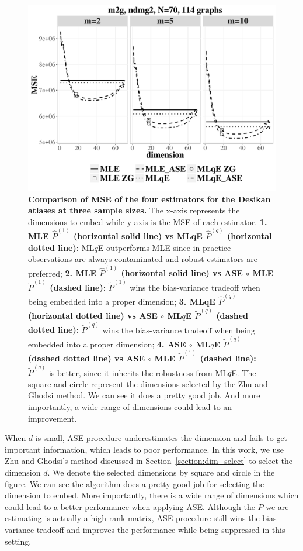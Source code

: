 \documentclass[a4paper]{article}
\renewcommand{\hat}{\widehat}
\begin{document}
\begin{figure}
\centering
\includegraphics[width=\textwidth]{CCI.pdf}
\caption{{\bf Comparison of MSE of the four estimators for the Desikan atlases at three sample sizes.}
The x-axis represents the dimensions to embed while y-axis is the MSE of each estimator.
{\bf 1. MLE $\hat{P}^{(1)}$ (horizontal solid line) vs MLqE $\hat{P}^{(q)}$ (horizontal dotted line):} 
ML$q$E outperforms MLE since in practice observations are always contaminated and robust estimators are preferred;
{\bf 2. MLE $\hat{P}^{(1)}$ (horizontal solid line) vs ASE $\circ$ MLE $\widetilde{P}^{(1)}$ (dashed line):} $\widetilde{P}^{(1)}$ wins the bias-variance tradeoff when being embedded into a proper dimension; 
{\bf 3. MLqE $\hat{P}^{(q)}$ (horizontal dotted line) vs ASE $\circ$ ML$q$E $\widetilde{P}^{(q)}$ (dashed dotted line):}
$\widetilde{P}^{(q)}$ wins the bias-variance tradeoff when being embedded into a proper dimension; 
{\bf 4.  ASE $\circ$ ML$q$E $\widetilde{P}^{(q)}$ (dashed dotted line) vs ASE $\circ$ MLE $\widetilde{P}^{(1)}$ (dashed line):}
$\widetilde{P}^{(q)}$ is better, since it inherits the robustness from ML$q$E. The square and circle represent the dimensions selected by the Zhu and Ghodsi method. We can see it does a pretty good job. And more importantly, a wide range of dimensions could lead to an improvement.
}
\label{fig:CCI}
\end{figure}

When $d$ is small, ASE procedure underestimates the dimension and fails to get important information, which leads to poor performance. In this work, we use Zhu and Ghodsi's method discussed in Section~\ref{section:dim_select} to select the dimension $d$. We denote the selected dimensions by square and circle in the figure. We can see the algorithm does a pretty good job for selecting the dimension to embed. More importantly, there is a wide range of dimensions which could lead to a better performance when applying ASE. Although the $P$ we are estimating is actually a high-rank matrix, ASE procedure still wins the bias-variance tradeoff and improves the performance while being suppressed in this setting.
\end{document}
